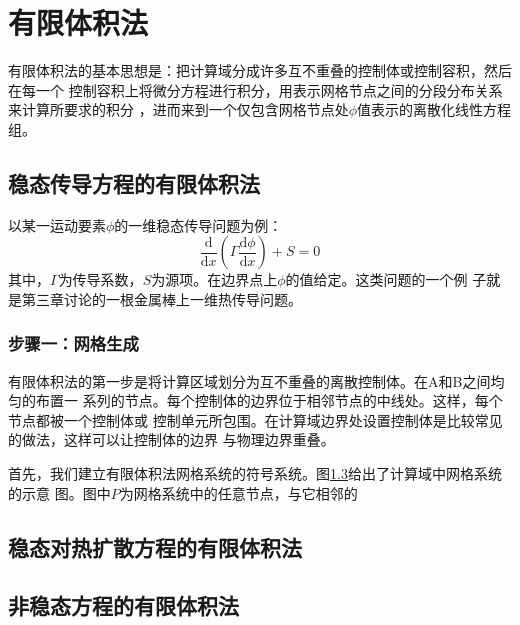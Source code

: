 \chapter{有限体积法}
有限体积法的基本思想是：把计算域分成许多互不重叠的控制体或控制容积，然后在每一个
控制容积上将微分方程进行积分，用表示网格节点之间的分段分布关系来计算所要求的积分
，进而来到一个仅包含网格节点处$\phi$值表示的离散化线性方程组。

\section{稳态传导方程的有限体积法}
以某一运动要素$\phi$的一维稳态传导问题为例：
\begin{equation}
  \frac{\mathrm{d}}{\mathrm{d} x}(\Gamma \frac{\mathrm{d} \phi}{\mathrm{d} x}) +
  S = 0
\end{equation}
其中，$\Gamma$为传导系数，$S$为源项。在边界点上$\phi$的值给定。这类问题的一个例
子就是第三章讨论的一根金属棒上一维热传导问题。

\subsection{步骤一：网格生成}
有限体积法的第一步是将计算区域划分为互不重叠的离散控制体。在A和B之间均匀的布置一
系列的节点。每个控制体的边界位于相邻节点的中线处。这样，每个节点都被一个控制体或
控制单元所包围。在计算域边界处设置控制体是比较常见的做法，这样可以让控制体的边界
与物理边界重叠。

首先，我们建立有限体积法网格系统的符号系统。图\ref{}给出了计算域中网格系统的示意
图。图中$P$为网格系统中的任意节点，与它相邻的
\section{稳态对热扩散方程的有限体积法}

\section{非稳态方程的有限体积法}

